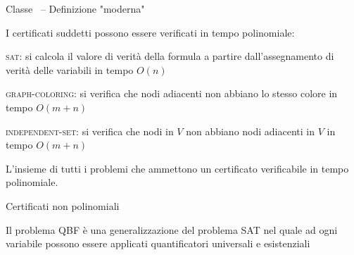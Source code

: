 \begin{frame}{Classe \NP\ -- Definizione "moderna"}

I certificati suddetti possono essere verificati in tempo polinomiale:
\BIL
\item \textsc{sat}: si calcola il valore di verità della formula a partire dall'assegnamento di verità delle variabili in tempo $O(n)$
\item \textsc{graph-coloring}: si verifica che nodi adiacenti non abbiano lo stesso
colore in tempo $O(m+n)$
\item \textsc{independent-set}: si verifica che nodi in $V$ non abbiano nodi
adiacenti in $V$ in tempo $O(m+n)$
\EIL

\begin{myboxtitle}[Classe \NP]
L'insieme di tutti i problemi che ammettono un certificato verificabile
in tempo polinomiale.    
\end{myboxtitle}

\end{frame}



\begin{frame}{Certificati non polinomiali}

\vspace{-9pt}
\begin{myboxtitle}
Il problema QBF è una generalizzazione del problema SAT nel quale ad ogni variabile possono essere applicati quantificatori universali e esistenziali
\end{myboxtitle}

\vspace{-3pt}
\end{frame}

